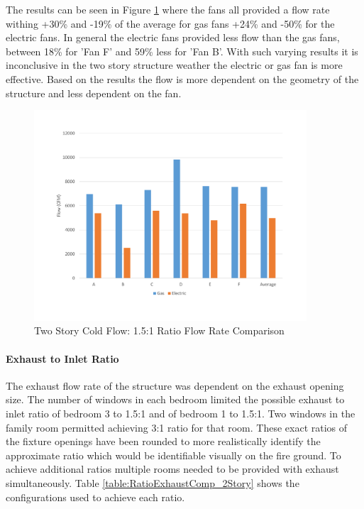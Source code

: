 \documentclass{article}
\begin{document}
The results can be seen in Figure \ref{fig:1_1RatioOutTwoStory} where the fans all provided a flow rate withing +30\% and -19\% of the average for gas fans +24\% and -50\% for the electric fans. In general the electric fans provided less flow than the gas fans, between 18\%  for 'Fan F' and 59\% less for 'Fan B'.  With such varying results it is inconclusive in the two story structure weather the electric or gas fan is more effective. Based on the results the flow is more dependent on the geometry of the structure and less dependent on the fan. 

\begin{figure}[H]
	\centering
	\includegraphics[width=4in]{0_Images/ColdFlow/Two_Story/1_1Ratio.pdf}
	\caption{Two Story Cold Flow: 1.5:1 Ratio Flow Rate Comparison}
	\label{fig:1_1RatioOutTwoStory}
\end{figure}


\paragraph{Exhaust to Inlet Ratio} \mbox{}

The exhaust flow rate of the structure was dependent on the exhaust opening size. The number of windows in each bedroom limited the possible exhaust to inlet ratio of bedroom 3 to 1.5:1 and of bedroom 1 to 1.5:1.  Two windows in the family room permitted achieving 3:1 ratio for that room. These exact ratios of the fixture openings have been rounded to more realistically identify the approximate ratio which would be identifiable visually on the fire ground. To achieve additional ratios multiple rooms needed to be provided with exhaust simultaneously. Table \ref{table:RatioExhaustComp_2Story} shows the configurations used to achieve each ratio.
\end{document}
